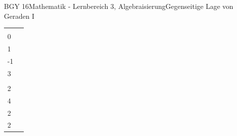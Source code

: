 \documentclass[oneside,openany,headings=optiontotoc,11pt,numbers=noenddot]{scrreprt}
\begin{document}
\begin{worksheet}{BGY 16}{Mathematik - Lernbereich 3, Algebraisierung}{Gegenseitige Lage von Geraden I}
\begin{framed}
\begin{center}
\begin{tabularx}{\textwidth}{X|X}
					\(g: \vec{x} = \left(\begin{array}{c}1\\0\end{array}\right) + r\left(\begin{array}{c}2\\1\end{array}\right)\) & 
					\(g: \vec{x} = \left(\begin{array}{c}2\\-1\end{array}\right) + r\left(\begin{array}{c}-6\\3\end{array}\right)\)\\
					\(h: \vec{x} = \left(\begin{array}{c}3\\2\end{array}\right) + t\left(\begin{array}{c}5\\4\end{array}\right)\) & \(h: \vec{x} = \left(\begin{array}{c}3\\2\end{array}\right) + t\left(\begin{array}{c}1\\2\end{array}\right)\)\\
				\end{tabularx}
			\end{center}
			

\end{framed}
\end{worksheet}
\end{document}
